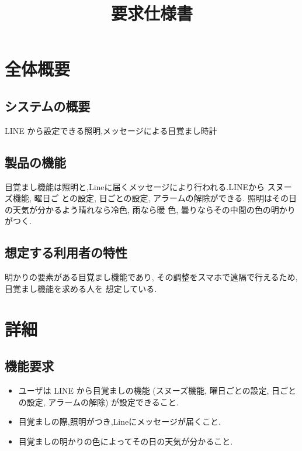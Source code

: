 \documentclass{jarticle}
\title{要求仕様書}
\date{}
\begin{document}
\maketitle

\section*{全体概要}
\subsection*{システムの概要}
LINE から設定できる照明,メッセージによる目覚まし時計
\subsection*{製品の機能}
目覚まし機能は照明と,Lineに届くメッセージにより行われる.LINEから スヌーズ機能, 曜日ご
との設定, 日ごとの設定, アラームの解除ができる. 照明はその日の天気が分かるよう晴れなら冷色, 雨なら暖
色, 曇りならその中間の色の明かりがつく.
\subsection*{想定する利用者の特性}
明かりの要素がある目覚まし機能であり, その調整をスマホで遠隔で行えるため, 目覚まし機能を求める人を
想定している.

\section*{詳細}
\subsection*{機能要求}
\begin{itemize}
    \item ユーザは LINE から目覚ましの機能 (スヌーズ機能, 曜日ごとの設定, 日ごとの設定, アラームの解除) が設定できること.\\
    \item 目覚ましの際,照明がつき,Lineにメッセージが届くこと.\\
    \item 目覚ましの明かりの色によってその日の天気が分かること.\\
\end{itemize}
\end{document}
